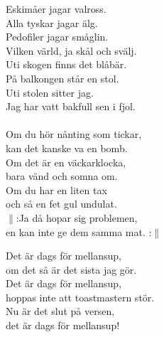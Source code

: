 \documentclass[a6paper, 10pt, twoside]{article}
\begin{document}
\begin{center}
\end{center}
\begin{lyrics}
\small Eskimåer jagar valross.\\
Alla tyskar jagar älg.\\
Pedofiler jagar småglin.\\
Vilken värld, ja skål och svälj.
\vspace{5pt}\\
Uti skogen finns det blåbär.\\
På balkongen står en stol.\\
Uti stolen sitter jag.\\
Jag har vatt bakfull sen i fjol.\\
\vspace{5pt}\\
Om du hör nånting som tickar,\\
kan det kanske va en bomb.\\
Om det är en väckarklocka,\\
bara vänd och somna om.\\
Om du har en liten tax\\
och så en fet gul undulat.\\
$\|$:Ja då hopar sig problemen,\\
en kan inte ge dem samma mat. :$\|$
\end{lyrics}
\begin{center}
\end{center}
\begin{lyrics}
\small Det är dags för mellansup,\\
om det så är det sista jag gör.\\
Det är dags för mellansup,\\ 
hoppas inte att toastmastern stör.\\
Nu är det slut på versen,\\
det är dags för mellansup!
\end{lyrics}
\end{document}
